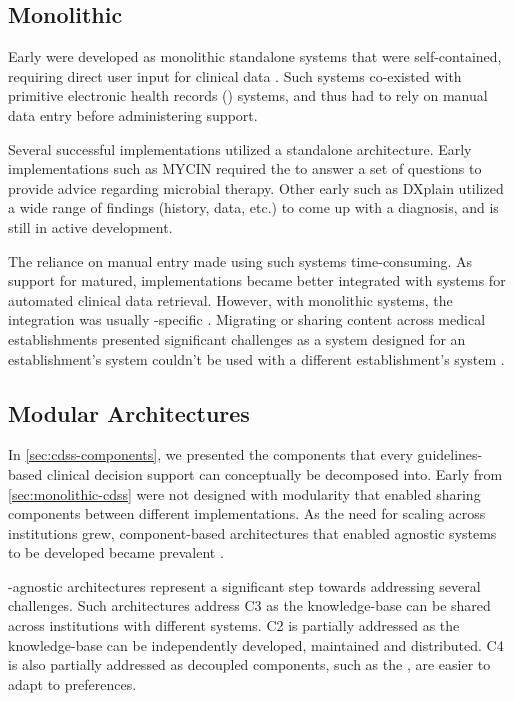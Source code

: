 \subsection{Monolithic \CDSSs{}}\label{sec:monolithic-cdss}

Early \CDSSs{} were developed as monolithic standalone systems
that were self-contained, requiring direct user input for clinical data
\cite{RodriguezBook16}. Such systems co-existed with
primitive electronic health records (\EHR{}) systems,
and thus had to rely on manual data entry before administering support.

Several successful \CDSSs{} implementations utilized a standalone
architecture. Early \CDSS{} implementations
such as MYCIN \cite{ShortliffeBook12} required the \HCP{}
to answer a set of questions to provide advice regarding microbial therapy.
Other early \CDSSs{} such as DXplain \cite{BarnettJAMA87} utilized a wide
range of findings (history, data, etc.) to come up with a diagnosis, and
is still in active development.

The reliance on manual entry made using such systems time-consuming. As support for \EHR{} matured,
\CDSSs{} implementations became better integrated with \EHR{} systems
for automated clinical data retrieval.
However, with monolithic systems, the integration was usually \EHR{}-specific \cite{RodriguezBook16}.
Migrating or sharing \CDSS{} content across medical establishments
presented significant challenges as a system designed
for an establishment's \EHR{} system couldn't be used with a different
establishment's \EHR{} system \cite{KawamotoJBI10}.

\subsection{Modular \CDSS{} Architectures}\label{sec:modular-architectures}

In \autoref{sec:cdss-components}, we presented the components that
every guidelines-based clinical decision support can conceptually be decomposed
into. Early \CDSSs{} from \autoref{sec:monolithic-cdss}
were not designed with modularity that enabled sharing components
between different implementations. As the need for scaling \CDSSs{}
across institutions grew, component-based architectures that
enabled \EHR{} agnostic systems to be developed became prevalent \cite{KawamotoJBI10}.

\EHR{}-agnostic architectures represent a significant step towards
addressing several challenges. Such architectures
address C3 as the knowledge-base can be shared across institutions with
different \EHR{} systems. C2 is partially addressed as the
knowledge-base can be independently developed, maintained and distributed.
C4 is also partially addressed as decoupled components, such as the \UI{},
are easier to adapt to \HCP{} preferences.

